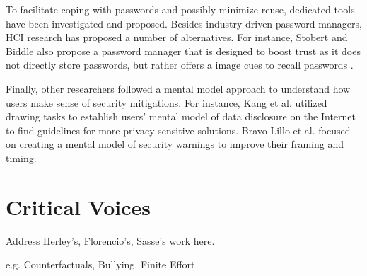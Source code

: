 	To facilitate coping with passwords and possibly minimize reuse, dedicated tools have been investigated and proposed. Besides industry-driven password managers, HCI research has proposed a number of alternatives. For instance, Stobert and Biddle also propose a password manager that is designed to boost trust as it does not directly store passwords, but rather offers a image cues to recall passwords \cite{Stobert2014Versipass}. 
	
	Finally, other researchers followed a mental model approach to understand how users make sense of security mitigations. For instance, Kang et al. utilized drawing tasks to establish users' mental model of data disclosure on the Internet \cite{Kang2015MentalModelsDrawing} to find guidelines for more privacy-sensitive solutions. Bravo-Lillo et al. focused on creating a mental model of security warnings \cite{BravoLillo2011WarningsMentalModel} to improve their framing and timing.
	
	
\section{Critical Voices}
Address Herley's, Florencio's, Sasse's work here. 

e.g. Counterfactuals, Bullying, Finite Effort 
